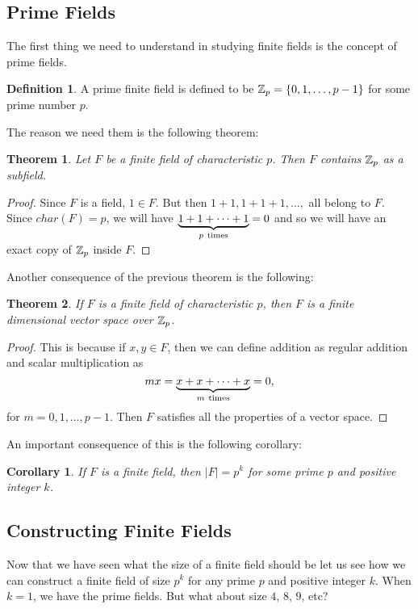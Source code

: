 \documentclass[12pt]{article}
\theoremstyle{plain}
\newtheorem{corollary}{Corollary}
\newtheorem{theorem}{Theorem}
\theoremstyle{definition}
\newtheorem{definition}{Definition}
\theoremstyle{remark}
\begin{document}
\subsection{Prime Fields}
The first thing we need to understand in studying finite fields is the concept of prime fields. 
\begin{definition}
A prime finite field is defined to be $\mathbb{Z}_p=\{0,1, \dots, p-1\}$ for some prime number $p$. 
\end{definition}
The reason we need them is the following theorem:
\begin{theorem}
Let $F$ be a finite field of characteristic $p$. Then $F$ contains $\mathbb{Z}_p$ as a subfield.
\end{theorem}
\begin{proof}
Since $F$ is a field, $1\in F$. But then $1+1, 1+1+1, \dots, $
all belong to $F$. Since $char(F)=p$, we will have $\underbrace{1 + 1+\cdots + 1}_{p\rm\ times}=0$ and so we will have an exact copy of $\mathbb{Z}_p$ inside $F$.  
\end{proof}

Another consequence of the previous theorem is the following:
\begin{theorem}
If $F$ is a finite field of characteristic $p$, then $F$ is a finite dimensional vector space over $\mathbb{Z}_p$.
\end{theorem}
\begin{proof}
This is because if $x,y \in F$, then we can define addition as regular addition and scalar multiplication as 
$$mx = \underbrace{x + x+\cdots + x}_{m\rm\ times}=0,$$
for $m=0,1, \dots, p-1$. Then $F$ satisfies all the properties of a vector space.
\end{proof}
An important consequence of this is the following corollary:
\begin{corollary}
If $F$ is a finite field, then $|F| = p^k$ for some prime $p$ and positive integer $k$. 
\end{corollary}

\subsection{Constructing Finite Fields}
Now that we have seen what the size of a finite field should be let us see how we can construct a finite field of size $p^k$ for any prime $p$ and positive integer $k$. When $k=1$, we have the prime fields. But what about size $4$, $8$, $9$, etc?
\end{document}
